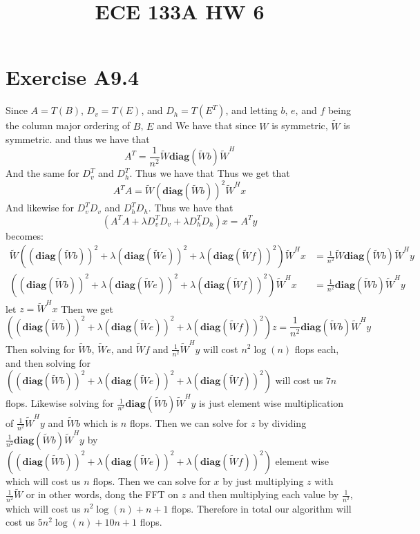 
\title{ECE 133A HW 6}

\maketitle
\section*{Exercise A9.4}
Since $A=T(B)$, $D_v=T(E)$, and $D_h=T(E^T)$, and letting
$b$, $e$, and $f$ being the column major ordering of $B$, $E$ and  
We have that since $W$ is symmetric, $\tilde{W}$ is symmetric. and thus we have that 
$$A^T=\frac{1}{n^2}\tilde{W}\textbf{diag}(\tilde{W}b)\tilde{W}^H$$
And the same for $D_v^T$ and $D_h^T$. Thus we have that
Thus we get that 
$$A^TA=\tilde{W}\left(\textbf{diag}(\tilde{W}b)\right)^2\tilde{W}^Hx$$
And likewise for $D_v^TD_v$ and $D_h^TD_h$. Thus we have that
$$(A^TA+\lambda D^T_vD_v+\lambda D^T_hD_h)x=A^Ty$$
becomes:
\begin{align*}
    \tilde{W}\left(\left(\textbf{diag}(\tilde{W}b)\right)^2 +\lambda \left(\textbf{diag}(\tilde{W}e)\right)^2 
            +\lambda \left(\textbf{diag}(\tilde{W}f)\right)^2\right)\tilde{W}^Hx
            &=\frac{1}{n^2}\tilde{W}\textbf{diag}(\tilde{W}b)\tilde{W}^Hy\\
            \left(\left(\textbf{diag}(\tilde{W}b)\right)^2 +\lambda \left(\textbf{diag}(\tilde{W}e)\right)^2 
            +\lambda \left(\textbf{diag}(\tilde{W}f)\right)^2\right)\tilde{W}^Hx
            &=\frac{1}{n^2}\textbf{diag}(\tilde{W}b)\tilde{W}^Hy
\end{align*}
let $z=\tilde{W}^Hx$ Then we get
$$\left(\left(\textbf{diag}(\tilde{W}b)\right)^2 +\lambda \left(\textbf{diag}(\tilde{W}e)\right)^2 
            +\lambda \left(\textbf{diag}(\tilde{W}f)\right)^2\right)z
            =\frac{1}{n^2}\textbf{diag}(\tilde{W}b)\tilde{W}^Hy$$
Then solving for $\tilde{W}b$, $\tilde{W}e$, and $\tilde{W}f$ and $\frac{1}{n^2}\tilde{W}^Hy$ 
will cost $n^2\log(n)$ flops each, and then solving for 
$\left(\left(\textbf{diag}(\tilde{W}b)\right)^2 +\lambda \left(\textbf{diag}(\tilde{W}e)\right)^2 
+\lambda \left(\textbf{diag}(\tilde{W}f)\right)^2\right)$ will cost 
us $7n$ flops. Likewise solving for $\frac{1}{n^2}\textbf{diag}(\tilde{W}b)\tilde{W}^Hy$
is just element wise multiplication of $\frac{1}{n^2}\tilde{W}^Hy$ and 
$\tilde{W}b$ which is $n$ flops. Then we can solve for 
$z$ by dividing $\frac{1}{n^2}\textbf{diag}(\tilde{W}b)\tilde{W}^Hy$
by $\left(\left(\textbf{diag}(\tilde{W}b)\right)^2 +\lambda \left(\textbf{diag}(\tilde{W}e)\right)^2
+\lambda \left(\textbf{diag}(\tilde{W}f)\right)^2\right)$
element wise which will cost us $n$ flops. Then we can solve for $x$ by 
just multiplying $z$ with $\frac{1}{n^2}\tilde{W}$ 
or in other words, dong the FFT on $z$ and then multiplying each
value by $\frac{1}{n^2}$, which will cost us $n^2\log(n)+n+1$ flops. 
Therefore in total our algorithm will cost us 
$5n^2\log(n)+10n+1$ flops.

